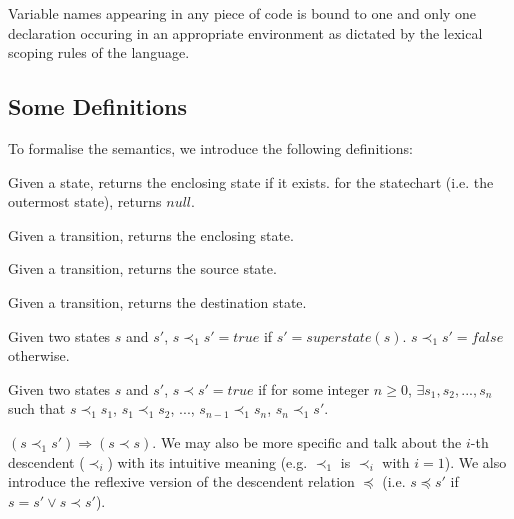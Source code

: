 \documentclass[12pt,a4paper]{report}
\begin{document}
Variable names appearing in any piece of code is bound to one and only one declaration occuring in an appropriate environment as dictated by the lexical scoping rules of the language.

\subsection{Some Definitions}
To formalise the semantics, we introduce the following definitions:

\begin{definition} \label{d:ss}
	Given a state, returns the enclosing state if it exists. for the statechart (i.e. the outermost state), returns $null$.
\end{definition}

\begin{definition} \label{d:s}
	Given a transition, returns the enclosing state.
\end{definition}

\begin{definition} \label{d:src}
	Given a transition, returns the source state.
\end{definition}

\begin{definition} \label{d:dest}
	Given a transition, returns the destination state.
\end{definition}

\begin{definition} \label{d:cs}
	Given two states $s$ and $s'$, $s \prec_1 s' = true$ if $s' = superstate(s)$. $s \prec_1 s' = false$ otherwise.
\end{definition}

\begin{definition} \label{d:desc}
	Given two states $s$ and $s'$, $s \prec s' = true$ if for some integer $n \geq 0$, $\exists s_1, s_2, ..., s_n$ such that $s \prec_1 s_1$, $s_1 \prec_1 s_2$, ..., $s_{n - 1} \prec_1 s_n$, $s_n \prec_1 s'$.
\end{definition}

$(s \prec_1 s') \Rightarrow (s \prec s)$. We may also be more specific and talk about the $i$-th descendent ($\prec_i$) with its intuitive meaning (e.g. $\prec_1$ is $\prec_i$ with $i = 1$). We also introduce the reflexive version of the descendent relation $\preceq$ (i.e. $s \preceq s'$ if $s = s' \lor s \prec s'$).
\end{document}
